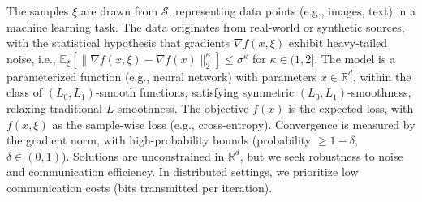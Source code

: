 The samples $\xi$ are drawn from $\mathcal{S}$, representing data points (e.g., images, text) in a machine learning task. The data originates from real-world or synthetic sources, with the statistical hypothesis that gradients $\nabla f(x, \xi)$ exhibit heavy-tailed noise, i.e., $\mathbb{E}_{\xi} [\|\nabla f(x, \xi) - \nabla f(x)\|_2^\kappa] \leq \sigma^\kappa$ for $\kappa \in (1,2]$. The model is a parameterized function (e.g., neural network) with parameters $x \in \mathbb{R}^d$, within the class of $(L_0, L_1)$-smooth functions, satisfying symmetric $(L_0, L_1)$-smoothness, relaxing traditional $L$-smoothness. The objective $f(x)$ is the expected loss, with $f(x, \xi)$ as the sample-wise loss (e.g., cross-entropy). Convergence is measured by the gradient norm, with high-probability bounds (probability $\geq 1 - \delta$, $\delta \in (0,1)$). Solutions are unconstrained in $\mathbb{R}^d$, but we seek robustness to noise and communication efficiency. In distributed settings, we prioritize low communication costs (bits transmitted per iteration).
